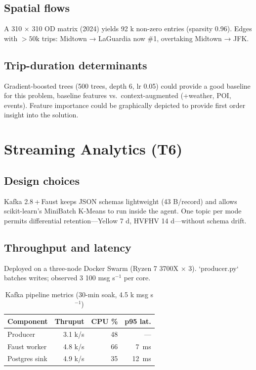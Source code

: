 \documentclass[conference]{IEEEtran}
\begin{document}
\subsection{Spatial flows}
A 310 × 310 OD matrix (2024) yields 92 k non-zero entries
(sparsity 0.96).  
Edges with \(>\!50\text{k}\) trips: Midtown → LaGuardia now \#1,
overtaking Midtown → JFK.

\subsection{Trip-duration determinants}
Gradient-boosted trees (500 trees, depth 6, lr 0.05) could provide a good baseline for this problem,
baseline features vs.\ context-augmented (+weather, POI, events).
Feature importance could be graphically depicted to provide first order insight into the solution.

\section{Streaming Analytics (T6)}\label{sec:stream}
\subsection{Design choices}
Kafka 2.8 + Faust keeps JSON schemas lightweight (43 B/record) and
allows scikit-learn’s MiniBatch K-Means to run inside the agent.  
One topic per mode permits differential retention—Yellow 7 d,
HVFHV 14 d—without schema drift.

\subsection{Throughput and latency}
Deployed on a three-node Docker Swarm (Ryzen 7 3700X × 3).  
`producer.py` batches writes; observed 3 100 msg s\(^{-1}\) per core.  

\begin{table}[htbp]
\caption{Kafka pipeline metrics (30-min soak, 4.5 k msg s\(^{-1}\))}
\label{tab:kafka-metrics}
\centering
\begin{tabular}{lrrr}
\toprule
Component & Thruput & CPU \% & p95 lat. \\ \midrule
Producer        & 3.1 k/s & 48 & — \\
Faust worker    & 4.8 k/s & 66 & \SI{7}{ms} \\
Postgres sink   & 4.9 k/s & 35 & \SI{12}{ms} \\
\bottomrule
\end{tabular}
\end{table}
\end{document}
